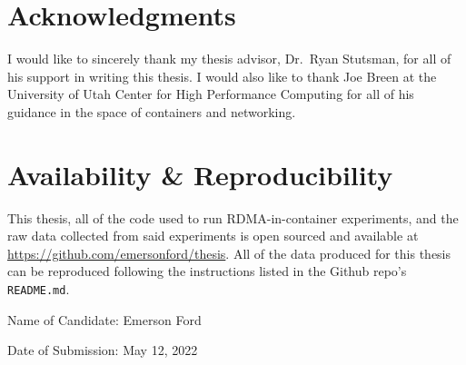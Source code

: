\documentclass[12pt,titlepage]{article}
\begin{document}
\section{Acknowledgments}
I would like to sincerely thank my thesis advisor, Dr.\ Ryan Stutsman, for all of his support in writing this thesis.
I would also like to thank Joe Breen at the University of Utah Center for High Performance Computing for all of his guidance in the space of containers and networking.

\section{Availability \& Reproducibility}
This thesis, all of the code used to run RDMA-in-container experiments, and the raw data collected from said experiments is open sourced and available at \newline\href{https://github.com/emersonford/thesis}{https://github.com/emersonford/thesis}.
All of the data produced for this thesis can be reproduced following the instructions listed in the Github repo's \texttt{README.md}.

\pagebreak
\printbibliography{}


\clearpage
\vspace*{10em}
\begin{center}
	Name of Candidate: Emerson Ford

	Date of Submission: May 12, 2022
\end{center}
\end{document}
